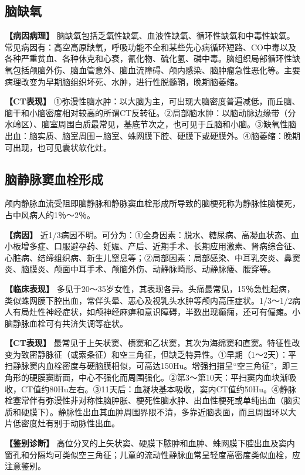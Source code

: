 \subsection{脑缺氧}

\textbf{【病因病理】}
脑缺氧包括乏氧性缺氧、血液性缺氧、循环性缺氧和中毒性缺氧。常见病因有：高空高原缺氧，呼吸功能不全和某些先心病循环短路、CO中毒以及各种严重贫血、各种休克和心衰，氰化物、硫化氢、磷中毒。脑组织局部循环性缺氧包括颅脑外伤、脑血管意外、脑血流障碍、颅内感染、脑肿瘤急性恶化等。主要病理改变为早期脑组织坏死、水肿，进行性脱髓鞘，晚期脑萎缩。

\textbf{【CT表现】}
①弥漫性脑水肿：以大脑为主，可出现大脑密度普遍减低，而丘脑、脑干和小脑密度相对较高的所谓CT反转征。②局部脑水肿：以脑动脉边缘带（分水岭区）、脑室周围白质最常见，基底节次之，也可见于丘脑和小脑。③缺氧性脑出血：脑实质、脑室周围－脑室、蛛网膜下腔、硬膜下或硬膜外。④脑萎缩：晚期可出现，也可见囊状软化灶。

\subsection{脑静脉窦血栓形成}

颅内静脉血流受阻即脑静脉和静脉窦血栓形成所导致的脑梗死称为静脉性脑梗死，占中风病人的1％～2％。

\textbf{【病因】}
近1/3病因不明。可分为：①全身因素：脱水、糖尿病、高凝血状态、血小板增多症、口服避孕药、妊娠、产后、近期手术、长期应用激素、肾病综合征、心脏病、结缔组织病、新生儿窒息等；②局部因素：局部感染、中耳乳突炎、鼻窦炎、脑膜炎、颅面中耳手术、颅脑外伤、动静脉畸形、动静脉瘘、腰穿等。

\textbf{【临床表现】}
多见于20～35岁女性，其表现各异。头痛最常见，15％急性起病，类似蛛网膜下腔出血，常伴头晕、恶心及视乳头水肿等颅内高压症状。1/3～1/2病人有局灶性神经症状，如颅神经麻痹和意识障碍，半数出现癫痫，还可有偏瘫。小脑静脉血栓可有共济失调等症状。

\textbf{【CT表现】}
最常见于上矢状窦、横窦和乙状窦，其次为海绵窦和直窦。特征性改变为致密静脉征（或索条征）和空三角征，但缺乏特异性。①早期（1～2天）：平扫静脉窦内血栓密度与硬脑膜相似，可高达150Hu。增强扫描呈“空三角征”，即三角形的硬膜窦断面，中心不强化而周围强化。②第3～第10天：平扫窦内血块渐吸收，CT值约80Hu左右。③11天后：血凝块基本吸收，窦内CT值约50Hu。④静脉栓塞常伴有弥漫性非对称性脑肿胀、梗死性脑水肿、出血性梗死或单纯出血（脑实质和硬膜下）。静脉性出血其血肿周围界限不清，多靠近脑表面，而且周围环以大片低密度灶有别于动脉性出血。

\textbf{【鉴别诊断】}
高位分叉的上矢状窦、硬膜下脓肿和血肿、蛛网膜下腔出血及窦内窗孔和分隔均可类似空三角征；儿童的流动性静脉血常呈轻度高密度类似血栓，应注意鉴别。

